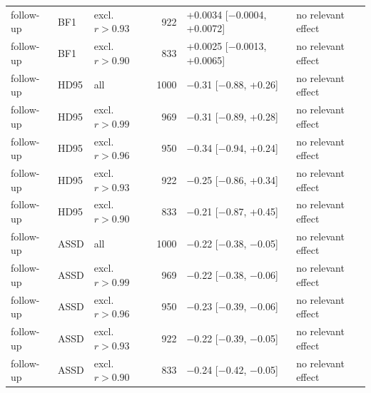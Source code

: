 \begin{tabular}{lllrll}
follow-up & BF1 & excl. $r>0.93$ & 922 & +0.0034 [$-$0.0004, +0.0072] & no relevant effect \\
follow-up & BF1 & excl. $r>0.90$ & 833 & +0.0025 [$-$0.0013, +0.0065] & no relevant effect \\
follow-up & HD95 & all & 1000 & $-$0.31 [$-$0.88, +0.26] & no relevant effect \\
follow-up & HD95 & excl. $r>0.99$ & 969 & $-$0.31 [$-$0.89, +0.28] & no relevant effect \\
follow-up & HD95 & excl. $r>0.96$ & 950 & $-$0.34 [$-$0.94, +0.24] & no relevant effect \\
follow-up & HD95 & excl. $r>0.93$ & 922 & $-$0.25 [$-$0.86, +0.34] & no relevant effect \\
follow-up & HD95 & excl. $r>0.90$ & 833 & $-$0.21 [$-$0.87, +0.45] & no relevant effect \\
follow-up & ASSD & all & 1000 & $-$0.22 [$-$0.38, $-$0.05] & no relevant effect \\
follow-up & ASSD & excl. $r>0.99$ & 969 & $-$0.22 [$-$0.38, $-$0.06] & no relevant effect \\
follow-up & ASSD & excl. $r>0.96$ & 950 & $-$0.23 [$-$0.39, $-$0.06] & no relevant effect \\
follow-up & ASSD & excl. $r>0.93$ & 922 & $-$0.22 [$-$0.39, $-$0.05] & no relevant effect \\
follow-up & ASSD & excl. $r>0.90$ & 833 & $-$0.24 [$-$0.42, $-$0.05] & no relevant effect \\
\bottomrule
\end{tabular}
